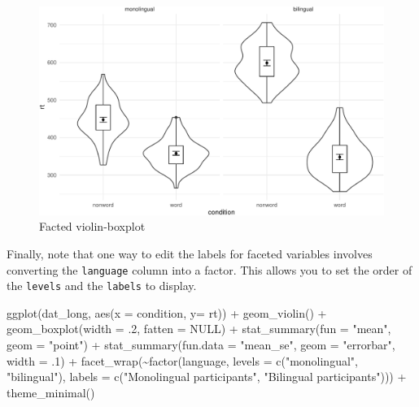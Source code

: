 \documentclass[
  english,
  doc,floatsintext]{apa6}
\newenvironment{Shaded}{\begin{snugshade}}{\end{snugshade}}
\newcommand{\AttributeTok}[1]{\textcolor[rgb]{0.77,0.63,0.00}{#1}}
\newcommand{\ConstantTok}[1]{\textcolor[rgb]{0.00,0.00,0.00}{#1}}
\newcommand{\DecValTok}[1]{\textcolor[rgb]{0.00,0.00,0.81}{#1}}
\newcommand{\FunctionTok}[1]{\textcolor[rgb]{0.00,0.00,0.00}{#1}}
\newcommand{\NormalTok}[1]{#1}
\newcommand{\SpecialCharTok}[1]{\textcolor[rgb]{0.00,0.00,0.00}{#1}}
\newcommand{\StringTok}[1]{\textcolor[rgb]{0.31,0.60,0.02}{#1}}
\begin{document}
\begin{figure}

{\centering \includegraphics[width=1\linewidth]{images/violin-boxplot-facet-1} 

}

\caption{Facted violin-boxplot}\label{fig:violin-boxplot-facet}
\end{figure}

Finally, note that one way to edit the labels for faceted variables involves converting the \texttt{language} column into a factor. This allows you to set the order of the \texttt{levels} and the \texttt{labels} to display.

\begin{Shaded}
\begin{Highlighting}[]
\FunctionTok{ggplot}\NormalTok{(dat\_long, }\FunctionTok{aes}\NormalTok{(}\AttributeTok{x =}\NormalTok{ condition, }\AttributeTok{y=}\NormalTok{ rt)) }\SpecialCharTok{+}
  \FunctionTok{geom\_violin}\NormalTok{() }\SpecialCharTok{+}
  \FunctionTok{geom\_boxplot}\NormalTok{(}\AttributeTok{width =}\NormalTok{ .}\DecValTok{2}\NormalTok{, }\AttributeTok{fatten =} \ConstantTok{NULL}\NormalTok{) }\SpecialCharTok{+}
  \FunctionTok{stat\_summary}\NormalTok{(}\AttributeTok{fun =} \StringTok{"mean"}\NormalTok{, }\AttributeTok{geom =} \StringTok{"point"}\NormalTok{) }\SpecialCharTok{+}
  \FunctionTok{stat\_summary}\NormalTok{(}\AttributeTok{fun.data =} \StringTok{"mean\_se"}\NormalTok{, }\AttributeTok{geom =} \StringTok{"errorbar"}\NormalTok{, }\AttributeTok{width =}\NormalTok{ .}\DecValTok{1}\NormalTok{) }\SpecialCharTok{+}
  \FunctionTok{facet\_wrap}\NormalTok{(}\SpecialCharTok{\textasciitilde{}}\FunctionTok{factor}\NormalTok{(language, }
                     \AttributeTok{levels =} \FunctionTok{c}\NormalTok{(}\StringTok{"monolingual"}\NormalTok{, }\StringTok{"bilingual"}\NormalTok{),}
                     \AttributeTok{labels =} \FunctionTok{c}\NormalTok{(}\StringTok{"Monolingual participants"}\NormalTok{, }
                                \StringTok{"Bilingual participants"}\NormalTok{))) }\SpecialCharTok{+}
  \FunctionTok{theme\_minimal}\NormalTok{()}
\end{Highlighting}
\end{Shaded}
\end{document}
